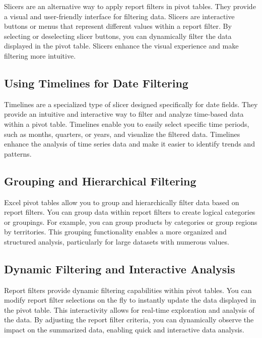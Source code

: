\documentclass[
]{book}
\begin{document}
Slicers are an alternative way to apply report filters in pivot tables. They provide a visual and user-friendly interface for filtering data. Slicers are interactive buttons or menus that represent different values within a report filter. By selecting or deselecting slicer buttons, you can dynamically filter the data displayed in the pivot table. Slicers enhance the visual experience and make filtering more intuitive.

\hypertarget{using-timelines-for-date-filtering}{%
\subsection{Using Timelines for Date Filtering}\label{using-timelines-for-date-filtering}}

Timelines are a specialized type of slicer designed specifically for date fields. They provide an intuitive and interactive way to filter and analyze time-based data within a pivot table. Timelines enable you to easily select specific time periods, such as months, quarters, or years, and visualize the filtered data. Timelines enhance the analysis of time series data and make it easier to identify trends and patterns.

\hypertarget{grouping-and-hierarchical-filtering}{%
\subsection{Grouping and Hierarchical Filtering}\label{grouping-and-hierarchical-filtering}}

Excel pivot tables allow you to group and hierarchically filter data based on report filters. You can group data within report filters to create logical categories or groupings. For example, you can group products by categories or group regions by territories. This grouping functionality enables a more organized and structured analysis, particularly for large datasets with numerous values.

\hypertarget{dynamic-filtering-and-interactive-analysis}{%
\subsection{Dynamic Filtering and Interactive Analysis}\label{dynamic-filtering-and-interactive-analysis}}

Report filters provide dynamic filtering capabilities within pivot tables. You can modify report filter selections on the fly to instantly update the data displayed in the pivot table. This interactivity allows for real-time exploration and analysis of the data. By adjusting the report filter criteria, you can dynamically observe the impact on the summarized data, enabling quick and interactive data analysis.
\end{document}
